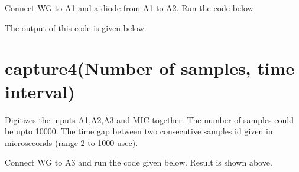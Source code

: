 \documentclass[a4paper,12pt,english]{sphinxmanual}
\let\sphinxpxdimen\pdfpxdimen\else\newdimen\sphinxpxdimen
\begin{document}
Connect WG to A1 and a diode from A1 to A2. Run the code below

\begin{sphinxVerbatim}[commandchars=\\\{\}]
   
 
   
\end{sphinxVerbatim}

The output of this code is given below.

\noindent\sphinxincludegraphics[width=400\sphinxpxdimen]{{halfwave}.pdf}
\noindent\sphinxincludegraphics[width=400\sphinxpxdimen]{{capture4}.pdf}


\section{capture4(Number of samples, time interval)}
\label{\detokenize{7.1:capture4-number-of-samples-time-interval}}
Digitizes the inputs A1,A2,A3 and MIC together. The number of samples
could be upto 10000. The time gap between two consecutive samples id
given in microseconds (range 2 to 1000 usec).

Connect WG to A3 and run the code given below. Result is shown above.

\begin{sphinxVerbatim}[commandchars=\\\{\}]
   
 
   
\PYG{p}{[}\PYG{p}{]}\PYG{p}{[}\PYG{p}{]}        
\PYG{p}{[}\PYG{p}{]}\PYG{p}{[}\PYG{p}{]}        
\end{sphinxVerbatim}
\end{document}
